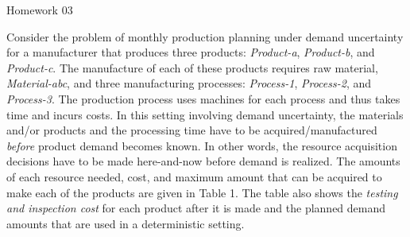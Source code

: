 \documentclass[7pt]{article}
\begin{document}
\vspace*{-2em}

\begin{center}
    \LARGE Homework 03
\end{center}
\vspace{1em}

\small{Consider the problem of monthly production planning under demand uncertainty
    for a manufacturer that produces three products: \textit{Product-a},
    \textit{Product-b}, and \textit{Product-c}. The manufacture of each of these
    products requires raw material, \textit{Material-abc}, and three manufacturing
    processes: \textit{Process-1}, \textit{Process-2}, and \textit{Process-3}. The
    production process uses machines for each process and thus takes time
    and incurs costs. In this setting involving demand uncertainty, the materials
    and/or products and the processing time have to be acquired/manufactured
    \textit{before} product demand becomes known. In other words, the resource
    acquisition decisions have to be made here-and-now before demand is realized.
    The amounts of each resource needed, cost, and maximum amount that can be
    acquired to make each of the products are given in Table 1. The
    table also shows the \textit{testing and inspection cost} for each product
    after it is made and the planned demand amounts that are used in a
    deterministic setting.}

\vspace{1em}
\end{document}
